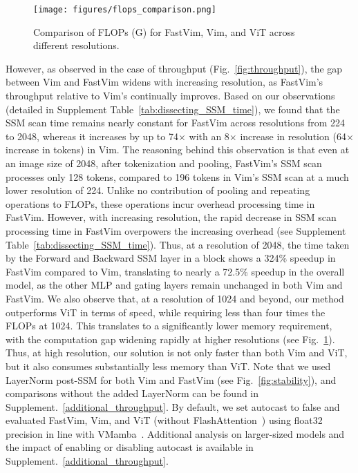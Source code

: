 \begin{figure}[!h]
\centering
    \texttt{[image: figures/flops\_comparison.png]} 
    \vspace{-8pt}
    \caption{
    Comparison of FLOPs (G) for FastVim, Vim, and ViT across different resolutions. 
    }
    \vspace{-4pt}
    \label{fig:flops}
\end{figure}


However, as observed in the case of throughput (Fig.~\ref{fig:throughput}), the gap between Vim and FastVim widens with increasing resolution, as FastVim's throughput relative to Vim's continually improves. Based on our observations (detailed in Supplement Table~\ref{tab:dissecting_SSM_time}), we found that the SSM scan time remains nearly constant for FastVim across resolutions from 224 to 2048, whereas it increases by up to 74$\times$ with an 8$\times$ increase in resolution (64$\times$ increase in tokens) in Vim. The reasoning behind this observation is that even at an image size of 2048, after tokenization and pooling, FastVim's SSM scan processes only 128 tokens, compared to 196 tokens in Vim's SSM scan at a much lower resolution of 224. Unlike no contribution of pooling and repeating operations to FLOPs, these operations incur overhead processing time in FastVim. However, with increasing resolution, the rapid decrease in SSM scan processing time in FastVim overpowers the increasing overhead (see Supplement Table~\ref{tab:dissecting_SSM_time}). Thus, at a resolution of 2048, the time taken by the Forward and Backward SSM layer in a block shows a 324\% speedup in FastVim compared to Vim, translating to nearly a 72.5\% speedup in the overall model, as the other MLP and gating layers remain unchanged in both Vim and FastVim. We also observe that, at a resolution of 1024 and beyond, our method outperforms ViT in terms of speed, while requiring less than four times the FLOPs at 1024. This translates to a significantly lower memory requirement, with the computation gap widening rapidly at higher resolutions (see Fig.~\ref{fig:flops}). Thus, at high resolution, our solution is not only faster than both Vim and ViT, but it also consumes substantially less memory than ViT. Note that we used LayerNorm post-SSM for both Vim and FastVim (see Fig.~\ref{fig:stability}), and comparisons without the added LayerNorm can be found in Supplement.~\ref{additional_throughput}. By default, we set autocast to false and evaluated FastVim, Vim, and ViT (without FlashAttention~\cite{dao2023flashattention, dao2022flashattention}) using float32 precision in line with VMamba~\cite{vmamba}. Additional analysis on larger-sized models and the impact of enabling or disabling autocast is available in Supplement.~\ref{additional_throughput}.




